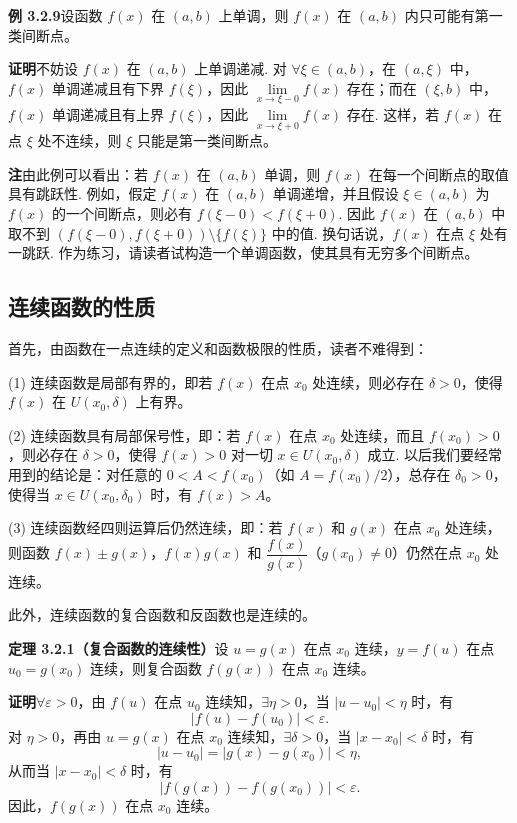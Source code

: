 \documentclass[UTF8,12pt,a4paper,fontset=fandol]{ctexart}
\begin{document}
\noindent\textbf{例 3.2.9}\quad 设函数 $f(x)$ 在 $(a,b)$ 上单调，则 $f(x)$ 在 $(a,b)$ 内只可能有第一类间断点。

\noindent\textbf{证明}\quad 不妨设 $f(x)$ 在 $(a,b)$ 上单调递减. 对 $\forall\xi\in(a,b)$，在 $(a,\xi)$ 中，$f(x)$ 单调递减且有下界 $f(\xi)$，因此 $\lim\limits_{x\to\xi-0}f(x)$ 存在；而在 $(\xi,b)$ 中，$f(x)$ 单调递减且有上界 $f(\xi)$，因此 $\lim\limits_{x\to\xi+0}f(x)$ 存在. 这样，若 $f(x)$ 在点 $\xi$ 处不连续，则 $\xi$ 只能是第一类间断点。

\noindent\textbf{注}\quad 由此例可以看出：若 $f(x)$ 在 $(a,b)$ 单调，则 $f(x)$ 在每一个间断点的取值具有跳跃性. 例如，假定 $f(x)$ 在 $(a,b)$ 单调递增，并且假设 $\xi\in(a,b)$ 为 $f(x)$ 的一个间断点，则必有 $f(\xi-0)<f(\xi+0)$. 因此 $f(x)$ 在 $(a,b)$ 中取不到 $(f(\xi-0),f(\xi+0))\setminus\{f(\xi)\}$ 中的值. 换句话说，$f(x)$ 在点 $\xi$ 处有一跳跃. 作为练习，请读者试构造一个单调函数，使其具有无穷多个间断点。

\subsection{连续函数的性质}

首先，由函数在一点连续的定义和函数极限的性质，读者不难得到：

(1) 连续函数是局部有界的，即若 $f(x)$ 在点 $x_0$ 处连续，则必存在 $\delta>0$，使得 $f(x)$ 在 $U(x_0,\delta)$ 上有界。

(2) 连续函数具有局部保号性，即：若 $f(x)$ 在点 $x_0$ 处连续，而且 $f(x_0)>0$，则必存在 $\delta>0$，使得 $f(x)>0$ 对一切 $x\in U(x_0,\delta)$ 成立. 以后我们要经常用到的结论是：对任意的 $0<A<f(x_0)$（如 $A=f(x_0)/2$），总存在 $\delta_0>0$，使得当 $x\in U(x_0,\delta_0)$ 时，有 $f(x)>A$。

(3) 连续函数经四则运算后仍然连续，即：若 $f(x)$ 和 $g(x)$ 在点 $x_0$ 处连续，则函数 $f(x)\pm g(x)$，$f(x)g(x)$ 和 $\dfrac{f(x)}{g(x)}$（$g(x_0)\ne0$）仍然在点 $x_0$ 处连续。

此外，连续函数的复合函数和反函数也是连续的。

\noindent\textbf{定理 3.2.1（复合函数的连续性）}\quad 设 $u=g(x)$ 在点 $x_0$ 连续，$y=f(u)$ 在点 $u_0=g(x_0)$ 连续，则复合函数 $f(g(x))$ 在点 $x_0$ 连续。

\noindent\textbf{证明}\quad $\forall\varepsilon>0$，由 $f(u)$ 在点 $u_0$ 连续知，$\exists\eta>0$，当 $|u-u_0|<\eta$ 时，有
\[
  |f(u)-f(u_0)|<\varepsilon.
\]
对 $\eta>0$，再由 $u=g(x)$ 在点 $x_0$ 连续知，$\exists\delta>0$，当 $|x-x_0|<\delta$ 时，有
\[
  |u-u_0|=|g(x)-g(x_0)|<\eta,
\]
从而当 $|x-x_0|<\delta$ 时，有
\[
  |f(g(x))-f(g(x_0))|<\varepsilon.
\]
因此，$f(g(x))$ 在点 $x_0$ 连续。
\end{document}
